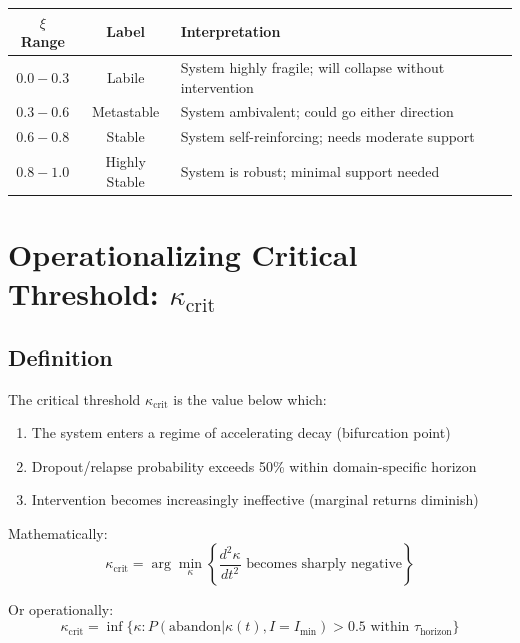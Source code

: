 \documentclass[11pt, a4paper]{article}
\begin{document}
\begin{center}
\begin{tabular}{|c|c|l|}
\hline
$\xi$ Range & Label & Interpretation \\
\hline
$0.0 - 0.3$ & Labile & System highly fragile; will collapse without intervention \\
$0.3 - 0.6$ & Metastable & System ambivalent; could go either direction \\
$0.6 - 0.8$ & Stable & System self-reinforcing; needs moderate support \\
$0.8 - 1.0$ & Highly Stable & System is robust; minimal support needed \\
\hline
\end{tabular}
\end{center}


\section{Operationalizing Critical Threshold: $\kappa_{\text{crit}}$}

\subsection{Definition}

\begin{definition}
The critical threshold $\kappa_{\text{crit}}$ is the value below which:

\begin{enumerate}
    \item The system enters a regime of accelerating decay (bifurcation point)
    \item Dropout/relapse probability exceeds 50\% within domain-specific horizon
    \item Intervention becomes increasingly ineffective (marginal returns diminish)
\end{enumerate}

Mathematically:
\begin{equation}
\kappa_{\text{crit}} = \arg\min_\kappa \left\{ \frac{d^2\kappa}{dt^2} \text{ becomes sharply negative} \right\}
\end{equation}

Or operationally:
\begin{equation}
\kappa_{\text{crit}} = \inf\{\kappa : P(\text{abandon} | \kappa(t), I=I_{\min}) > 0.5 \text{ within } \tau_{\text{horizon}}\}
\end{equation}
\end{definition}
\end{document}
